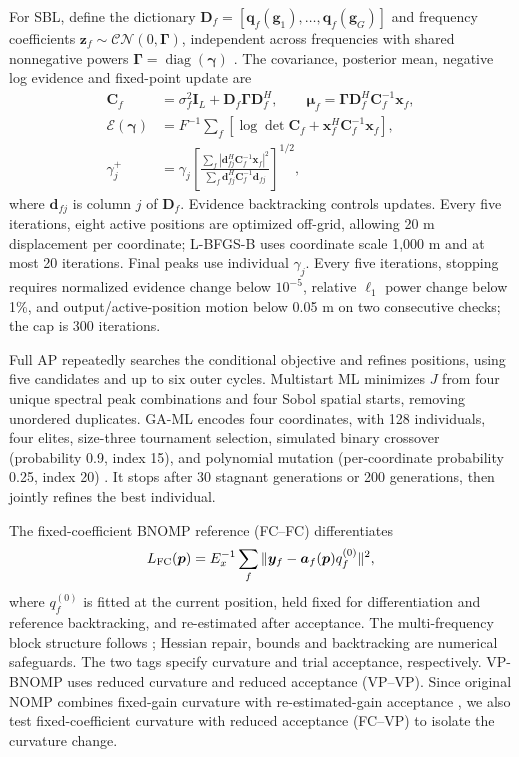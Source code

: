 \documentclass[a4paper,fleqn,review]{cas-sc}
\begin{document}
For SBL, define the dictionary $\bm D_f=[\bm q_f(\bm g_1),\ldots,\bm q_f(\bm g_G)]$ and frequency coefficients $\bm z_f\sim\mathcal{CN}(0,\bm\Gamma)$, independent across frequencies with shared nonnegative powers $\bm\Gamma=\operatorname{diag}(\bm\gamma)$ \cite{Nannuru2019}. The covariance, posterior mean, negative log evidence and fixed-point update are
\begin{align}
\bm C_f&=\sigma_f^2\bm I_L+\bm D_f\bm\Gamma\bm D_f^H,\qquad
\bm\mu_f=\bm\Gamma\bm D_f^H\bm C_f^{-1}\bm x_f,\\
\mathcal E(\bm\gamma)&=F^{-1}\sum_f
[\log\det\bm C_f+\bm x_f^H\bm C_f^{-1}\bm x_f],\\
\gamma_j^+&=\gamma_j\left[
\frac{\sum_f|\bm d_{fj}^H\bm C_f^{-1}\bm x_f|^2}
{\sum_f\bm d_{fj}^H\bm C_f^{-1}\bm d_{fj}}
\right]^{1/2},
\end{align}
where $\bm d_{fj}$ is column $j$ of $\bm D_f$. Evidence backtracking controls updates. Every five iterations, eight active positions are optimized off-grid, allowing 20 m displacement per coordinate; L-BFGS-B uses coordinate scale 1,000 m and at most 20 iterations. Final peaks use individual $\gamma_j$. Every five iterations, stopping requires normalized evidence change below $10^{-5}$, relative $\ell_1$ power change below 1\%, and output/active-position motion below 0.05 m on two consecutive checks; the cap is 300 iterations.

Full AP repeatedly searches the conditional objective and refines positions, using five candidates and up to six outer cycles. Multistart ML minimizes $J$ from four unique spectral peak combinations and four Sobol spatial starts, removing unordered duplicates. GA-ML encodes four coordinates, with 128 individuals, four elites, size-three tournament selection, simulated binary crossover (probability 0.9, index 15), and polynomial mutation (per-coordinate probability 0.25, index 20) \cite{DebAgrawal1995}. It stops after 30 stagnant generations or 200 generations, then jointly refines the best individual.

The fixed-coefficient BNOMP reference (FC--FC) differentiates
\begin{equation}
L_{\rm FC}(\bm p)=E_x^{-1}\sum_f
\|\bm y_f-\bm a_f(\bm p)q_f^{(0)}\|^2,
\label{en:fixedcoef}
\end{equation}
where $q_f^{(0)}$ is fitted at the current position, held fixed for differentiation and reference backtracking, and re-estimated after acceptance. The multi-frequency block structure follows \cite{Yang2022}; Hessian repair, bounds and backtracking are numerical safeguards. The two tags specify curvature and trial acceptance, respectively. VP-BNOMP uses reduced curvature and reduced acceptance (VP--VP). Since original NOMP combines fixed-gain curvature with re-estimated-gain acceptance \cite{Mamandipoor2016}, we also test fixed-coefficient curvature with reduced acceptance (FC--VP) to isolate the curvature change.
\end{document}
